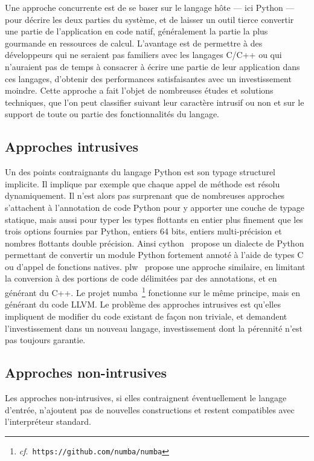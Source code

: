 \documentclass[renpar]{compas2013}
\begin{document}
Une approche concurrente est de se baser sur le langage hôte --- ici
Python --- pour décrire les deux parties du système, et de laisser un
outil tierce convertir une partie de l'application en code natif,
généralement la partie la plus gourmande en ressources de calcul.
L'avantage est de permettre à des développeurs qui ne seraient pas
familiers avec les langages C/C++ ou qui n'auraient pas de temps à
consacrer à écrire une partie de leur application dans ces langages,
d'obtenir des performances satisfaisantes avec un investissement moindre.
Cette approche a fait l'objet de nombreuses études et solutions
techniques, que l'on peut classifier suivant leur caractère intrusif ou
non et sur le support de toute ou partie des fonctionnalités du langage.

\subsection{Approches intrusives}

Un des points contraignants du langage Python est son typage structurel
implicite. Il implique par exemple que chaque appel de méthode est résolu
dynamiquement. Il n'est alors pas surprenant que de nombreuses approches
s'attachent à l'annotation de code Python pour y apporter une couche de
typage statique, mais aussi pour typer les types flottants en entier plus
finement que les trois options fournies par Python, entiers 64 bits,
entiers multi-précision et nombres flottants double précision. Ainsi
cython~\cite{cython2010} propose un dialecte de Python permettant de
convertir un module Python fortement annoté à l'aide de types C ou d'appel
de fonctions natives. plw~\cite{dongara2007} propose une approche
similaire, en limitant la conversion à des portions de code délimitées par
des annotations, et en générant du C++. Le projet
numba~\footnote{\emph{cf}.\ \texttt{https://github.com/numba/numba}}
fonctionne sur le même principe, mais en générant du code LLVM.  Le
problème des approches intrusives est qu'elles impliquent de modifier du
code existant de façon non triviale, et demandent l'investissement dans un
nouveau langage, investissement dont la pérennité n'est pas toujours
garantie.

\subsection{Approches non-intrusives}

Les approches non-intrusives, si elles contraignent éventuellement le
langage d'entrée, n'ajoutent pas de nouvelles constructions et restent
compatibles avec l'interpréteur standard.
\end{document}
